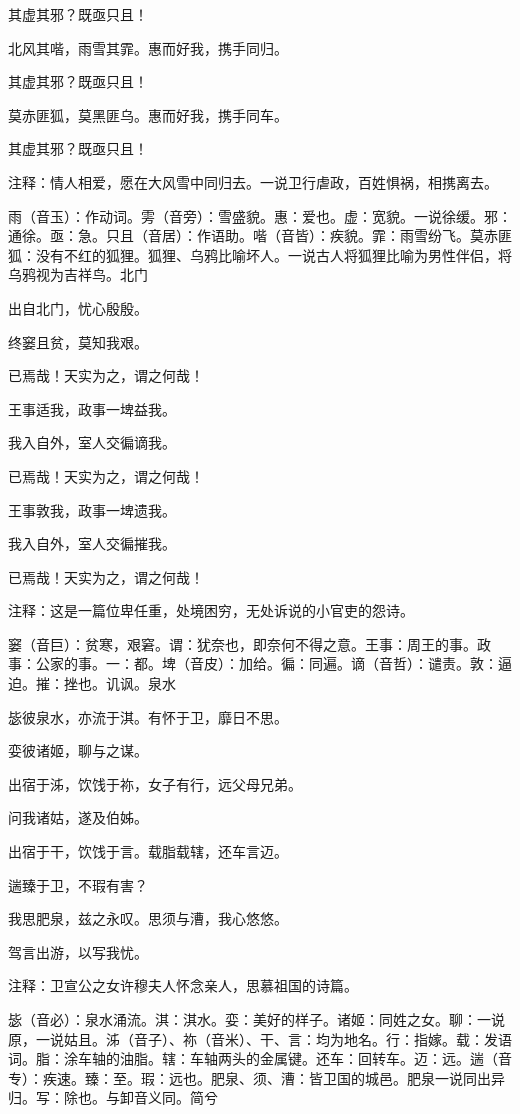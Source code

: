 \documentclass[12pt,UTF8]{ctexbook}
\begin{document}
其虚其邪？既亟只且！

北风其喈，雨雪其霏。惠而好我，携手同归。

其虚其邪？既亟只且！

莫赤匪狐，莫黑匪乌。惠而好我，携手同车。

其虚其邪？既亟只且！

注释：情人相爱，愿在大风雪中同归去。一说卫行虐政，百姓惧祸，相携离去。

雨（音玉）：作动词。雱（音旁）：雪盛貌。惠：爱也。虚：宽貌。一说徐缓。邪：通徐。亟：急。只且（音居）：作语助。喈（音皆）：疾貌。霏：雨雪纷飞。莫赤匪狐：没有不红的狐狸。狐狸、乌鸦比喻坏人。一说古人将狐狸比喻为男性伴侣，将乌鸦视为吉祥鸟。北门

出自北门，忧心殷殷。

终窭且贫，莫知我艰。

已焉哉！天实为之，谓之何哉！

王事适我，政事一埤益我。

我入自外，室人交徧谪我。

已焉哉！天实为之，谓之何哉！

王事敦我，政事一埤遗我。

我入自外，室人交徧摧我。

已焉哉！天实为之，谓之何哉！

注释：这是一篇位卑任重，处境困穷，无处诉说的小官吏的怨诗。

窭（音巨）：贫寒，艰窘。谓：犹奈也，即奈何不得之意。王事：周王的事。政事：公家的事。一：都。埤（音皮）：加给。徧：同遍。谪（音哲）：谴责。敦：逼迫。摧：挫也。讥讽。泉水

毖彼泉水，亦流于淇。有怀于卫，靡日不思。

娈彼诸姬，聊与之谋。

出宿于泲，饮饯于祢，女子有行，远父母兄弟。

问我诸姑，遂及伯姊。

出宿于干，饮饯于言。载脂载辖，还车言迈。

遄臻于卫，不瑕有害？

我思肥泉，兹之永叹。思须与漕，我心悠悠。

驾言出游，以写我忧。

注释：卫宣公之女许穆夫人怀念亲人，思慕祖国的诗篇。

毖（音必）：泉水涌流。淇：淇水。娈：美好的样子。诸姬：同姓之女。聊：一说原，一说姑且。泲（音子）、祢（音米）、干、言：均为地名。行：指嫁。载：发语词。脂：涂车轴的油脂。辖：车轴两头的金属键。还车：回转车。迈：远。遄（音专）：疾速。臻：至。瑕：远也。肥泉、须、漕：皆卫国的城邑。肥泉一说同出异归。写：除也。与卸音义同。简兮
\end{document}
